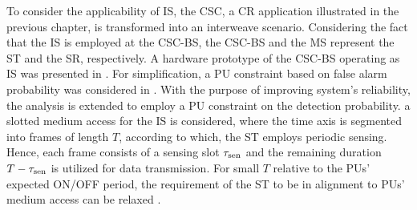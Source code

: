 To consider the applicability of IS, the CSC, a CR application illustrated in the previous chapter, is transformed into an interweave scenario. Considering the fact that the IS is employed at the CSC-BS, the CSC-BS and the MS represent the ST and the SR, respectively. A hardware prototype of the CSC-BS operating as IS was presented in \cite{Kaushik13}. For simplification, a PU constraint based on false alarm probability was considered in \cite{Kaushik13}. With the purpose of improving system's reliability, the analysis is extended to employ a PU constraint on the detection probability.  a slotted medium access for the IS is considered, where the time axis is segmented into frames of length $T$, according to which, the ST employs periodic sensing. Hence, each frame consists of a sensing slot $\tau_{\text{sen}}$ and the remaining duration $T - \tau_{\text{sen}}$ is utilized for data transmission. For small $T$ relative to the PUs' expected ON/OFF period, the requirement of the ST to be in alignment to PUs' medium access can be relaxed \cite{Wang09, Tang11, Zhao12}.  
 
